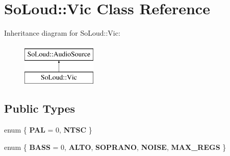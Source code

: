 \hypertarget{class_so_loud_1_1_vic}{}\section{So\+Loud\+::Vic Class Reference}
\label{class_so_loud_1_1_vic}
Inheritance diagram for So\+Loud\+::Vic\+:\begin{figure}[H]
\begin{center}
\leavevmode
\includegraphics[height=2.000000cm]{class_so_loud_1_1_vic}
\end{center}
\end{figure}
\subsection*{Public Types}
\begin{DoxyCompactItemize}
\item 
\mbox{\label{class_so_loud_1_1_vic_a395aeedca43fa56912e0e3e4ec3e005e}} 
enum \{ {\bfseries P\+AL} = 0, 
{\bfseries N\+T\+SC}
 \}
\item 
\mbox{\label{class_so_loud_1_1_vic_aabdb92824915ee280c055a07370627ce}} 
enum \{ \newline
{\bfseries B\+A\+SS} = 0, 
{\bfseries A\+L\+TO}, 
{\bfseries S\+O\+P\+R\+A\+NO}, 
{\bfseries N\+O\+I\+SE}, 
\newline
{\bfseries M\+A\+X\+\_\+\+R\+E\+GS}
 \}
\end{DoxyCompactItemize}
